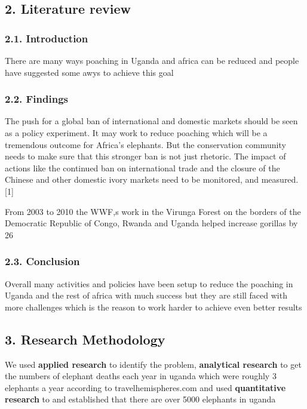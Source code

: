 \documentclass[12pt]{article}
\begin{document}
\subsection*{2. Literature review}
\subsubsection*{2.1. Introduction}
There are many ways poaching in Uganda and africa can be reduced and people have suggested some awys to achieve this goal

\subsubsection*{2.2. Findings}
The push for a global ban of international and domestic markets should be seen as a policy experiment. It may work to reduce poaching which will be a tremendous outcome for Africa’s elephants. But the conservation community needs to make sure that this stronger ban is not just rhetoric. The impact of actions like the continued ban on international trade and the closure of the Chinese and other domestic ivory markets need to be monitored, and measured.[1]

From 2003 to 2010 the WWF,s work in the Virunga Forest on the borders of the Democratic Republic of Congo, Rwanda and Uganda helped increase gorillas by 26%

\subsubsection*{2.3. Conclusion}
Overall many activities and policies have been setup to reduce the poaching in Uganda and the rest of africa with much success but they are still faced with more challenges which is the reason to work harder to achieve even better results

\subsection *{3. Research Methodology}

We used\textbf{ applied research} to identify the problem, \textbf{analytical research} to get the 
numbers of elephant deaths each year in
uganda which were roughly 3 elephants a year according 
to travelhemispheres.com and used \textbf{quantitative research} to and 
established that there are over 5000 
elephants in uganda
\end{document}
